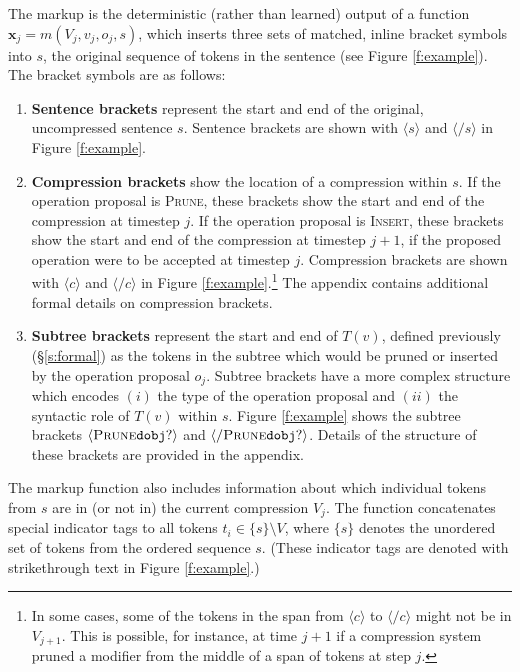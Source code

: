 \documentclass[11pt,a4paper]{article}
\begin{document}
The markup is the deterministic (rather than learned) output of a function $\bm{x}_j=m(V_j,v_j,o_j,s)$, which inserts three sets of matched, inline bracket symbols into $s$, the original sequence of tokens in the sentence (see Figure \ref{f:example}). The bracket symbols are as follows:

\begin{enumerate}
\item{\textbf{Sentence brackets} represent the start and end of the original, uncompressed sentence $s$. Sentence brackets are shown with $\langle s \rangle$ and $\langle / s \rangle$ in Figure \ref{f:example}.}
\item{\textbf{Compression brackets} show the location of a compression within $s$. If the operation proposal is \textsc{Prune}, these brackets show the start and end of the compression at timestep $j$. If the operation proposal is \textsc{Insert}, these brackets show the start and end of the compression at timestep $j+1$, if the proposed operation were to be accepted at timestep $j$. Compression brackets are shown with $\langle c \rangle$ and $\langle / c \rangle$ in Figure \ref{f:example}.\footnote{In some cases, some of the tokens in the span from $\langle c \rangle$ to $\langle /c \rangle$ might not be in $V_{j + 1}$. This is possible, for instance, at time $j+1$ if a compression system pruned a modifier from the middle of a span of tokens at step $j$.} The appendix contains additional formal details on compression brackets.}
\item{\textbf{Subtree brackets} represent the start and end of $T(v)$, defined previously (\S\ref{s:formal}) as the tokens in the subtree which would be pruned or inserted by the operation proposal $o_j$. Subtree brackets have a more complex structure which encodes $(i)$ the type of the operation proposal and $(ii)$ the syntactic role of $T(v)$ within $s$. Figure \ref{f:example} shows the subtree brackets $\langle \textsc{Prune} \texttt{dobj} ? \rangle$ and $\langle / \textsc{Prune} \texttt{dobj} ? \rangle$. Details of the structure of these brackets are provided in the appendix.}
\end{enumerate}

The markup function also includes information about which individual tokens from $s$ are in (or not in) the current compression $V_j$. The function concatenates special indicator tags to all tokens $t_i \in \{s\} \setminus V$, where $\{s\}$ denotes the unordered set of tokens from the ordered sequence $s$. (These indicator tags are denoted with strikethrough text in Figure \ref{f:example}.) 
\end{document}
